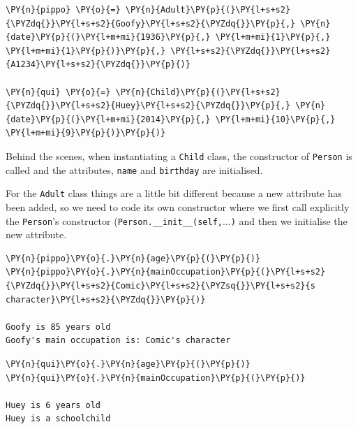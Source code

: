 \begin{tcolorbox}[breakable, size=fbox, boxrule=1pt, pad at break*=1mm,colback=cellbackground, colframe=cellborder]
\begin{Verbatim}[commandchars=\\\{\}]
\PY{n}{pippo} \PY{o}{=} \PY{n}{Adult}\PY{p}{(}\PY{l+s+s2}{\PYZdq{}}\PY{l+s+s2}{Goofy}\PY{l+s+s2}{\PYZdq{}}\PY{p}{,} \PY{n}{date}\PY{p}{(}\PY{l+m+mi}{1936}\PY{p}{,} \PY{l+m+mi}{1}\PY{p}{,} \PY{l+m+mi}{1}\PY{p}{)}\PY{p}{,} \PY{l+s+s2}{\PYZdq{}}\PY{l+s+s2}{A1234}\PY{l+s+s2}{\PYZdq{}}\PY{p}{)}

\PY{n}{qui} \PY{o}{=} \PY{n}{Child}\PY{p}{(}\PY{l+s+s2}{\PYZdq{}}\PY{l+s+s2}{Huey}\PY{l+s+s2}{\PYZdq{}}\PY{p}{,} \PY{n}{date}\PY{p}{(}\PY{l+m+mi}{2014}\PY{p}{,} \PY{l+m+mi}{10}\PY{p}{,} \PY{l+m+mi}{9}\PY{p}{)}\PY{p}{)}
\end{Verbatim}
\end{tcolorbox}

Behind the scenes, when instantiating a \texttt{Child} class, the constructor of \texttt{Person} is called and the attributes, \texttt{name} and \texttt{birthday} are initialised.  

For the \texttt{Adult} class things are a little bit different because a new attribute has been added, so we need to code its own constructor where we first call explicitly the \texttt{Person}'s constructor (\texttt{Person.\_\_init\_\_(self,$\ldots$)} and then we initialise the new attribute.

\begin{tcolorbox}[breakable, size=fbox, boxrule=1pt, pad at break*=1mm,colback=cellbackground, colframe=cellborder]
\begin{Verbatim}[commandchars=\\\{\}]
\PY{n}{pippo}\PY{o}{.}\PY{n}{age}\PY{p}{(}\PY{p}{)}
\PY{n}{pippo}\PY{o}{.}\PY{n}{mainOccupation}\PY{p}{(}\PY{l+s+s2}{\PYZdq{}}\PY{l+s+s2}{Comic}\PY{l+s+s2}{\PYZsq{}}\PY{l+s+s2}{s character}\PY{l+s+s2}{\PYZdq{}}\PY{p}{)}

Goofy is 85 years old
Goofy's main occupation is: Comic's character
\end{Verbatim}
\end{tcolorbox}

\begin{tcolorbox}[breakable, size=fbox, boxrule=1pt, pad at break*=1mm,colback=cellbackground, colframe=cellborder]
\begin{Verbatim}[commandchars=\\\{\}]
\PY{n}{qui}\PY{o}{.}\PY{n}{age}\PY{p}{(}\PY{p}{)}
\PY{n}{qui}\PY{o}{.}\PY{n}{mainOccupation}\PY{p}{(}\PY{p}{)}

Huey is 6 years old
Huey is a schoolchild
\end{Verbatim}
\end{tcolorbox}
